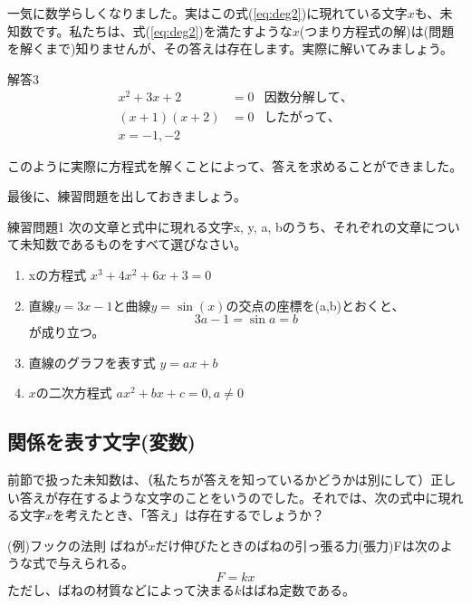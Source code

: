 \documentclass[uplatex,dvipdfmx]{jsarticle}
\begin{document}
	一気に数学らしくなりました。実はこの式(\ref{eq:deg2})に現れている文字$x$も、未知数です。私たちは、式(\ref{eq:deg2})を満たすような$x$(つまり方程式の解)は(問題を解くまで)知りませんが、その答えは存在します。実際に解いてみましょう。
	
	\begin{itembox}[l]{解答3}
		\begin{align*}
			x^2 + 3x + 2&=0 &因数分解して、\\
			(x+1)(x+2) &= 0 &したがって、\\
			x=-1, -2
		\end{align*}
	\end{itembox}
	
	このように実際に方程式を解くことによって、答えを求めることができました。
	
	最後に、練習問題を出しておきましょう。
	
	\begin{itembox}[l]{練習問題1}
		次の文章と式中に現れる文字x, y, a, bのうち、それぞれの文章について未知数であるものをすべて選びなさい。
		
		\begin{enumerate}
			\item xの方程式 $x^3+4x^2+6x+3 = 0$
			\item 直線$y=3x-1$と曲線$y=\sin(x)$の交点の座標を(a,b)とおくと、
			\begin{equation}
				3a-1 = \sin a = b
			\end{equation}
			が成り立つ。
			\item 直線のグラフを表す式 $y = ax+b$
			\item $x$の二次方程式 $ax^2+bx+c = 0, a\neq 0$
		\end{enumerate}
	\end{itembox}
		
	\subsection{関係を表す文字(変数)}
	前節で扱った未知数は、（私たちが答えを知っているかどうかは別にして）正しい答えが存在するような文字のことをいうのでした。それでは、次の式中に現れる文字$x$を考えたとき、「答え」は存在するでしょうか？
	
	\begin{itembox}[l]{(例)フックの法則}
		ばねが$x$だけ伸びたときのばねの引っ張る力(張力)Fは次のような式で与えられる。
		\begin{equation}
			F = kx　\label{eq:fook}
		\end{equation}
		ただし、ばねの材質などによって決まる$k$はばね定数である。
	\end{itembox}
	
\end{document}
